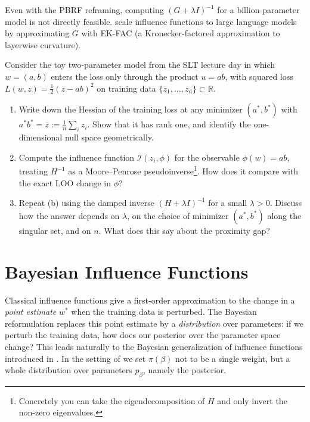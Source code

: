 \documentclass[11pt]{article}
\begin{document}
\begin{remark}\label{rem:scaling}
Even with the PBRF reframing, computing $(G + \lambda I)^{-1}$ for a billion-parameter model is not directly feasible. \citet{grosse2023studying} scale influence functions to large language models by approximating $G$ with EK-FAC (a Kronecker-factored approximation to layerwise curvature).
\end{remark}

\begin{exercise}\label{ex:if-degenerate}
Consider the toy two-parameter model from the SLT lecture day in which $w = (a,b)$ enters the loss only through the product $u = ab$, with squared loss $L(w,z) = \tfrac12(z - ab)^2$ on training data $\{z_1,\dots,z_n\}\subset\mathbb{R}$.
\begin{enumerate}
  \item[(a)] Write down the Hessian of the training loss at any minimizer $(a^*,b^*)$ with $a^* b^* = \bar z := \tfrac1n\sum_i z_i$. Show that it has rank one, and identify the one-dimensional null space geometrically.
  \item[(b)] Compute the influence function $\mathcal{I}(z_i,\phi)$ for the observable $\phi(w) = ab$, treating $H^{-1}$ as a Moore--Penrose pseudoinverse\footnote{Concretely you can take the eigendecomposition of $H$ and only invert the non-zero eigenvalues.}. How does it compare with the exact LOO change in $\phi$?
  \item[(c)] Repeat (b) using the damped inverse $(H + \lambda I)^{-1}$ for a small $\lambda > 0$. Discuss how the answer depends on $\lambda$, on the choice of minimizer $(a^*,b^*)$ along the singular set, and on $n$. What does this say about the proximity gap?
\end{enumerate}
\end{exercise}


\section{Bayesian Influence Functions}\label{sec:bayesian-if}

Classical influence functions give a first-order approximation to the change in a \emph{point estimate} $w^*$ when the training data is perturbed. The Bayesian reformulation replaces this point estimate by a \emph{distribution} over parameters: if we perturb the training data, how does our posterior over the parameter space change? This leads naturally to the Bayesian generalization of influence functions introduced in \citet{kreer2025bif}. In the setting of  we set $\pi(\beta)$ not to be a single weight, but a whole distribution over parameters $p_{\beta}$, namely the posterior.
\end{document}

